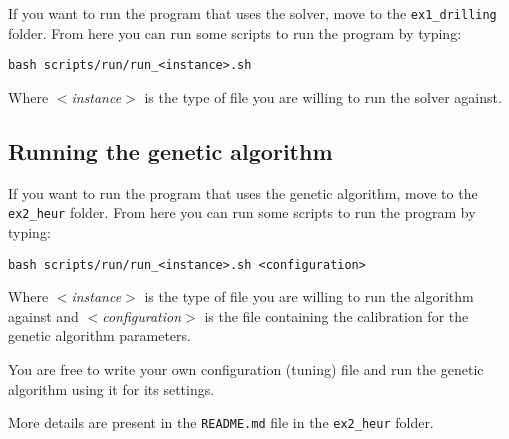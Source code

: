 If you want to run the program that uses the \cplex{} solver, move to the
\texttt{ex1\_drilling} folder. From here you can run some scripts to run the
program by typing:

\begin{verbatim}
bash scripts/run/run_<instance>.sh
\end{verbatim}

Where $<$\textit{instance}$>$ is the type of file you are willing to run the
solver against.

\subsection{Running the genetic algorithm}

If you want to run the program that uses the genetic algorithm, move to the
\texttt{ex2\_heur} folder. From here you can run some scripts to run the
program by typing:

\begin{verbatim}
bash scripts/run/run_<instance>.sh <configuration>
\end{verbatim}

Where $<$\textit{instance}$>$ is the type of file you are willing to run the
algorithm against and $<$\textit{configuration}$>$ is the file containing the
calibration for the genetic algorithm parameters.

You are free to write your own configuration (tuning) file and run the genetic
algorithm using it for its settings.

More details are present in the \texttt{README.md} file in the
\texttt{ex2\_heur} folder.

